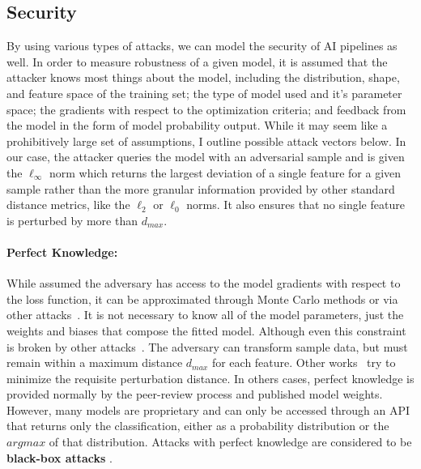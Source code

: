 \documentclass[conference]{IEEEtran}
\begin{document}
\subsection{Security}
By using various types of attacks, we can model the security of AI pipelines as well. In order to measure robustness of a given model, it is assumed that the attacker knows most things about the model, including the distribution, shape, and feature space of the training set; the type of model used and it's parameter space; the gradients with respect to the optimization criteria; and feedback from the model in the form of model probability output. While it may seem like a prohibitively large set of assumptions, I outline possible attack vectors below. In our case, the attacker queries the model with an adversarial sample and is given the $\ell_{\infty}$ norm which returns the largest deviation of a single feature for a given sample rather than the more granular information provided by other standard distance metrics, like the $\ell_2$ or $\ell_{0}$ norms. It also ensures that no single feature is perturbed by more than $d_{max}$. 

\paragraph{Perfect Knowledge: }
While assumed the adversary has access to the model gradients with respect to the loss function, it can be approximated through Monte Carlo methods or via other attacks~\cite{wang2019security, chakraborty2018adversarial}. It is not necessary to know all of the model parameters, just the weights and biases that compose the fitted model. Although even this constraint is broken by other attacks~\cite{wang2019security, chakraborty2018adversarial}. The adversary can transform sample data, but must remain within a maximum distance $d_{max}$ for each feature. Other works~\cite{biggio2012poisoning, stutz2019confidence, li2016general} try to minimize the requisite perturbation distance. In others cases, perfect knowledge is provided normally by the peer-review process and published model weights. However, many models are proprietary and can only be accessed through an API that returns only the classification, either as a probability distribution or the $argmax$ of that distribution. Attacks with perfect knowledge are considered to be \textbf{black-box attacks} \cite{chakraborty_adversarial_2018}.
\end{document}
